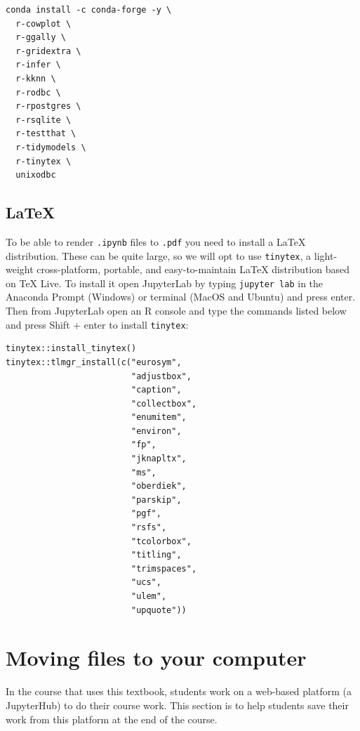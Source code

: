 \documentclass[
]{krantz}
\begin{document}
\begin{verbatim}
conda install -c conda-forge -y \
  r-cowplot \
  r-ggally \
  r-gridextra \
  r-infer \
  r-kknn \
  r-rodbc \
  r-rpostgres \
  r-rsqlite \
  r-testthat \
  r-tidymodels \
  r-tinytex \
  unixodbc
\end{verbatim}

\hypertarget{latex}{%
\subsection{LaTeX}\label{latex}}

To be able to render \texttt{.ipynb} files to \texttt{.pdf} you need to install a LaTeX
distribution. These can be quite large, so we will opt to use \texttt{tinytex}, a
light-weight cross-platform, portable, and easy-to-maintain LaTeX distribution
based on TeX Live. To install it open JupyterLab by typing \texttt{jupyter\ lab}
in the Anaconda Prompt (Windows) or terminal (MacOS and Ubuntu) and press enter.
Then from JupyterLab open an R console and type the commands listed below and
press Shift + enter to install \texttt{tinytex}:

\begin{verbatim}
tinytex::install_tinytex()
tinytex::tlmgr_install(c("eurosym", 
                         "adjustbox",
                         "caption",
                         "collectbox",
                         "enumitem",
                         "environ",
                         "fp",
                         "jknapltx",
                         "ms",
                         "oberdiek",
                         "parskip",
                         "pgf",
                         "rsfs",
                         "tcolorbox",
                         "titling",
                         "trimspaces",
                         "ucs",
                         "ulem",
                         "upquote"))
\end{verbatim}

\hypertarget{moving-files-to-your-computer}{%
\section{Moving files to your computer}\label{moving-files-to-your-computer}}

In the course that uses this textbook, students work on a web-based platform
(a JupyterHub) to do their course work. This section is to help students
save their work from this platform at the end of the course.
\end{document}
